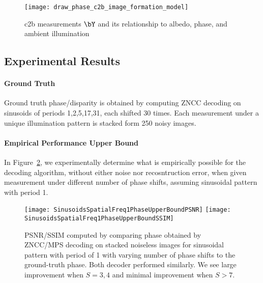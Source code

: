 \documentclass[../writeup.tex]{subfiles}
\begin{document}
\begin{figure}[h!]
    \begin{center}
        \texttt{[image: draw\_phase\_c2b\_image\_formation\_model]}
        \caption{c2b measurements $\bY$ and its relationship to albedo, phase, and ambient illumination}
        \label{fig:draw_phase_c2b_image_formation_model}
    \end{center}
\end{figure}  






\subsection{Experimental Results}

\paragraph{Ground Truth} Ground truth phase/disparity is obtained by computing ZNCC decoding on sinusoids of periods 1,2,5,17,31, each shifted 30 times. Each measurement under a unique illumination pattern is stacked form 250 noisy images. 

\paragraph{Empirical Performance Upper Bound} In Figure~\ref{fig:sinusiods_spatial_freq_1_phase_upper_bound_wrt_S}, we experimentally determine what is empirically possible for the decoding algorithm, without either noise nor recosntruction error, when given measurement under different number of phase shifts, assuming sinusoidal pattern with period 1.
\begin{figure}[h!]
    \begin{center}
        \texttt{[image: SinusoidsSpatialFreq1PhaseUpperBoundPSNR]}
        \texttt{[image: SinusoidsSpatialFreq1PhaseUpperBoundSSIM]}
        \caption{PSNR/SSIM computed by comparing phase obtained by ZNCC/MPS decoding on stacked noiseless images for sinusoidal pattern with period of 1 with varying number of phase shifts to the ground-truth phase. Both decoder performed similarly. We see large improvement when $S=3,4$ and minimal improvement when $S>7$.}
        \label{fig:sinusiods_spatial_freq_1_phase_upper_bound_wrt_S}
    \end{center}
\end{figure}  
\end{document}
